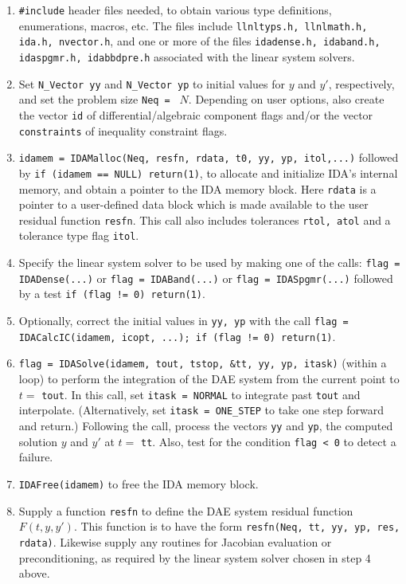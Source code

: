 \begin{enumerate}

\item {\tt \#include} header files needed, to obtain various type
definitions, enumerations, macros, etc.  The files include
{\tt llnltyps.h, llnlmath.h, ida.h, nvector.h}, and one or more of the
files  {\tt idadense.h, idaband.h, idaspgmr.h, idabbdpre.h} associated
with the linear system solvers.

\item Set {\tt N\_Vector yy} and {\tt N\_Vector yp} to initial values 
for $y$ and $y'$, respectively, and set the problem size {\tt Neq = }
$N$.  Depending on user options, also create the vector {\tt id} of
differential/algebraic component flags and/or the vector 
{\tt constraints} of inequality constraint flags.

\item {\tt idamem = IDAMalloc(Neq, resfn, rdata, t0, yy, yp, itol,...)} 
followed by \newline
{\tt if (idamem == NULL) return(1)}, to allocate and initialize
IDA's internal memory, and obtain a pointer to the IDA memory block.  
Here {\tt rdata} is a pointer to a user-defined data block which is
made available to the user residual function {\tt resfn}.
This call also includes tolerances {\tt rtol, atol} and a 
tolerance type flag {\tt itol}.

\item Specify the linear system solver to be used by making one of the
calls: \newline 
{\tt flag = IDADense(...)} or {\tt flag = IDABand(...)} or
{\tt flag = IDASpgmr(...)} \newline
followed by a test {\tt if (flag != 0) return(1)}.

\item Optionally, correct the initial values  in {\tt yy, yp} with 
the call \newline
{\tt flag = IDACalcIC(idamem, icopt, ...); if (flag != 0) return(1)}.

\item {\tt flag = IDASolve(idamem, tout, tstop, \&tt, yy, yp, itask)} 
\newline (within a loop) to perform the integration of the DAE system 
from the current point to $t =$ {\tt tout}.  In this call, set 
{\tt itask = NORMAL} to integrate past {\tt tout} and interpolate.
(Alternatively, set {\tt itask = ONE\_STEP} to take one step forward
and return.)  Following the call, process the vectors {\tt yy} and 
{\tt yp}, the computed solution $y$ and $y'$ at $t = $ {\tt tt}.
Also, test for the condition {\tt flag < 0} to detect a failure.

\item {\tt IDAFree(idamem)} to free the IDA memory block.

\item Supply a function {\tt resfn} to define the DAE system residual 
function $F(t,y,y')$.  This function is to have the form 
{\tt resfn(Neq, tt, yy, yp, res, rdata)}.  Likewise supply any
routines for Jacobian evaluation or preconditioning, as required by
the linear system solver chosen in step 4 above.

\end{enumerate}
